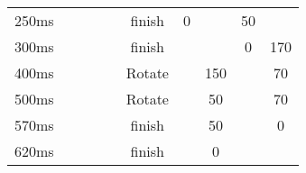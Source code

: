 \begin{frame}
\begin{table}[]
\begin{adjustbox}{width=0.8\textwidth}
\begin{tabular}{c|cccc|c|cccc}
                \pause 250ms                            & \PTwo{}                                         & \PThree{}       & \POne{}         &                 & \PZero{} finish  & \alert{0}         &                  & 50               &                    \\
                \pause 300ms                            & \PThree{}                                       & \POne{}         &                 &                 & \PTwo{} finish   &                   &                  & \alert{0}        & 170                \\
                \pause 400ms                            & \POne{}                                         & \PThree{}       &                 &                 & \alert{Rotate}   &                   & 150              &                  & \alert{70}         \\
                \pause 500ms                            & \PThree{}                                       & \POne{}         &                 &                 & \alert{Rotate}   &                   & \alert{50}       &                  & 70                 \\
                \pause 570ms                            & \POne{}                                         &                 &                 &                 & \PThree{} finish &                   & 50               &                  & \alert{0}          \\
                \pause 620ms                            &                                                 &                 &                 &                 & \POne{} finish   &                   & \alert{0}        &                  &
            \end{tabular}
        \end{adjustbox}
    \end{table}

\end{frame}
